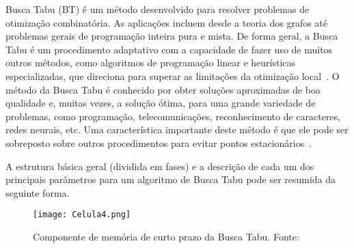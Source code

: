 Busca Tabu (BT) é um método desenvolvido para resolver problemas de otimização combinatória. As aplicações incluem desde a teoria dos grafos até problemas gerais de programação inteira pura e mista. De forma geral, a Busca Tabu é um procedimento adaptativo com a capacidade de fazer uso de muitos outros métodos, como algoritmos de programação linear e heurísticas especializadas, que direciona para superar as limitações da otimização local~\citep{glover1989tabu}. O método da Busca Tabu é conhecido por obter soluções aproximadas de boa qualidade e, muitas vezes, a solução ótima, para uma grande variedade de problemas, como programação, telecomunicações, reconhecimento de caracteres, redes neurais, etc. Uma característica importante deste método é que ele pode ser sobreposto sobre outros procedimentos para evitar pontos estacionários~\citep{glover1990tabu}. 

A estrutura básica geral (dividida em fases) e a descrição de cada um dos principais parâmetros para um algoritmo de Busca Tabu pode ser resumida da seguinte forma. 

\begin{figure}[t]
\begin{center}
\texttt{[image: Celula4.png]}
\caption{Componente de memória de curto prazo da Busca Tabu. Fonte:~\cite{glover1990tabu}}\label{fig:04}
\end{center}
\end{figure}


